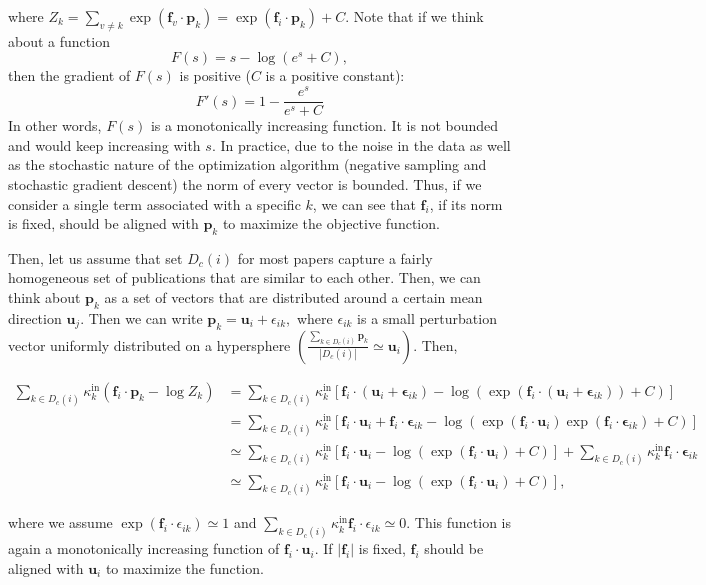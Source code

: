 \documentclass[12pt]{article}
\begin{document}
\begin{refsection}
where $Z_k = \sum_{v \neq k} \exp{(\mathbf{f}_{v} \cdot \mathbf{p}_k)} = \exp(\mathbf{f}_i \cdot \mathbf{p}_k) +C.$ Note that if we think about a function 
\[
F(s) = s - \log(  e^s +C),
\]
then the gradient of $F(s)$ is positive ($C$ is a positive constant):
\[
    F'(s) = 1 - \frac{e^s}{ e^s +C}
\]
In other words, $F(s)$ is a monotonically increasing function. It is not bounded and would keep increasing with $s$. In practice, due to the noise in the data as well as the stochastic nature of the optimization algorithm (negative sampling and stochastic gradient descent) the norm of every vector is bounded. Thus, if we consider a single term associated with a specific $k$, we can see that $\mathbf{f}_i$, if its norm is fixed, should be aligned with $\mathbf{p}_k$ to maximize the objective function. 

Then, let us assume that set $D_c(i)$ for most papers capture a fairly homogeneous set of publications that are similar to each other. Then, we can think about $\mathbf{p}_k$ as a set of vectors that are distributed around a certain mean direction $\mathbf{u}_j$. Then we can write $\mathbf{p}_k = \mathbf{u}_i + \epsilon_{ik},$ where $\epsilon_{ik}$ is a small perturbation vector uniformly distributed on a hypersphere $(\frac{\sum_{k \in D_c(i)} \mathbf{p}_k }{|D_c(i)|} \simeq \mathbf{u}_i).$ Then,

\begin{align*}
     \sum_{k \in D_c(i)} \kappa_k^{\text{in}} (\mathbf{f}_i \cdot \mathbf{p}_k - \log Z_k) &= \sum_{k\in D_c(i)}\kappa_{k}^{\text{in}} \left[ \mathbf{f}_i \cdot (\mathbf{u}_i +  \mathbf{\epsilon}_{ik}) - \log ( \exp(\mathbf{f}_i \cdot (\mathbf{u}_i +  \mathbf{\epsilon}_{ik})) + C ) \right] \\
&= \sum_{k\in D_c(i)}\kappa_{k}^{\text{in}} \left[ \mathbf{f}_i \cdot \mathbf{u}_i +  \mathbf{f}_i \cdot \mathbf{\epsilon}_{ik} - \log ( \exp(\mathbf{f}_i \cdot \mathbf{u}_i) \exp(\mathbf{f}_i \cdot \mathbf{\epsilon}_{ik}) + C ) \right] \\
&\simeq  \sum_{k\in D_c(i)}\kappa_{k}^{\text{in}} \left[ \mathbf{f}_i \cdot \mathbf{u}_i - \log ( \exp(\mathbf{f}_i \cdot \mathbf{u}_i ) + C) \right] + \sum_{k\in D_c(i)}\kappa_{k}^{\text{in}} \mathbf{f}_i \cdot \mathbf{\epsilon}_{ik} \\
&\simeq \sum_{k\in D_c(i)} \kappa_{k}^{\text{in}}\left[ \mathbf{f}_i \cdot \mathbf{u}_i - \log ( \exp(\mathbf{f}_i \cdot \mathbf{u}_i ) + C) \right],
\end{align*}

where we assume $\exp(\mathbf{f}_i \cdot \epsilon_{ik}) \simeq 1$ and $\sum_{k \in D_c(i)} \kappa_k^{\text{in}} \mathbf{f}_i \cdot \epsilon_{ik} \simeq 0.$ This function is again a monotonically increasing function of $\mathbf{f}_i \cdot \mathbf{u}_i.$ If $|\mathbf{f}_i|$ is fixed, $\mathbf{f}_i$ should be aligned with $\mathbf{u}_i$ to maximize the function. 




\end{refsection}
\end{document}
